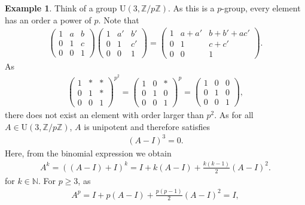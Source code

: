 \documentclass[12pt]{report}
\theoremstyle{plain}
\theoremstyle{remark}
\theoremstyle{definition}
\newtheorem{example}[theorem]{Example}
\newcommand{\N}{\mathbb{N}}
\newcommand{\Z}{\mathbb{Z}}
\begin{document}
\begin{example}
    Think of a group $\mathrm{U}(3,\Z/p\Z)$. As this is a $p$-group, every element has an order a power of $p$. Note that
    \begin{align*}
        \begin{pmatrix}
            1 & a & b \\ 0 & 1 & c \\ 0 & 0 & 1
        \end{pmatrix} \begin{pmatrix}
            1 & a' & b' \\ 0 & 1 & c' \\ 0 & 0 & 1
        \end{pmatrix} = \begin{pmatrix}
            1 & a+a' & b+b'+ac' \\ 0 & 1 & c+c' \\ 0 & 0 & 1
        \end{pmatrix}.
    \end{align*}
    As
    \begin{align*}
        \begin{pmatrix}
            1 & * & * \\ 0 & 1 & * \\ 0 & 0 & 1
        \end{pmatrix}^{p^2} = \begin{pmatrix}
            1 & 0 & * \\ 0 & 1 & 0 \\ 0 & 0 & 1
        \end{pmatrix}^p = \begin{pmatrix}
            1 & 0 & 0 \\ 0 & 1 & 0 \\ 0 & 0 & 1
        \end{pmatrix},
    \end{align*}
    there does not exist an element with order larger than $p^2$. As for all $A\in \mathrm{U}(3,\Z/p\Z)$, $A$ is unipotent and therefore satisfies
    \begin{align*}
        (A-I)^3 = 0.
    \end{align*}
    Here, from the binomial expression we obtain
    \begin{align*}
        A^k = ((A-I)+I)^k = I + k(A-I) + \frac{k(k-1)}{2}(A-I)^2.
    \end{align*}
    for $k\in\N$. For $p\ge 3$, as
    \begin{align*}
        A^p = I + p(A-I) + \frac{p(p-1)}{2}(A-I)^2 = I,

\end{align*}
\end{example}
\end{document}
